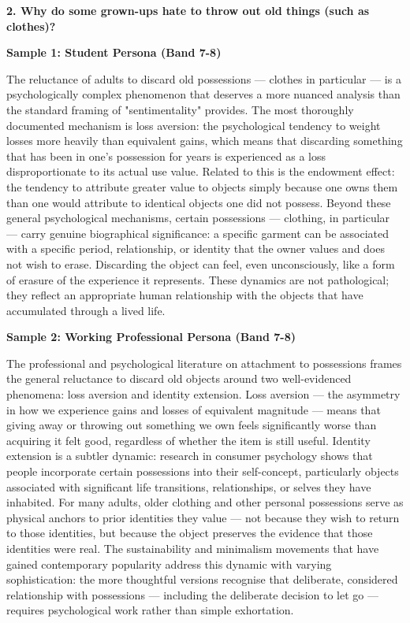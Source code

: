 \separator

\begin{ieltsquestion}
\textbf{2. Why do some grown-ups hate to throw out old things (such as clothes)?}
\end{ieltsquestion}
\textbf{Sample 1: Student Persona (Band 7-8)}

The reluctance of adults to discard old possessions — clothes in particular — is a psychologically complex phenomenon that deserves a more nuanced analysis than the standard framing of "sentimentality" provides. The most thoroughly documented mechanism is loss aversion: the psychological tendency to weight losses more heavily than equivalent gains, which means that discarding something that has been in one's possession for years is experienced as a loss disproportionate to its actual use value. Related to this is the endowment effect: the tendency to attribute greater value to objects simply because one owns them than one would attribute to identical objects one did not possess. Beyond these general psychological mechanisms, certain possessions — clothing, in particular — carry genuine biographical significance: a specific garment can be associated with a specific period, relationship, or identity that the owner values and does not wish to erase. Discarding the object can feel, even unconsciously, like a form of erasure of the experience it represents. These dynamics are not pathological; they reflect an appropriate human relationship with the objects that have accumulated through a lived life.

\textbf{Sample 2: Working Professional Persona (Band 7-8)}

The professional and psychological literature on attachment to possessions frames the general reluctance to discard old objects around two well-evidenced phenomena: loss aversion and identity extension. Loss aversion — the asymmetry in how we experience gains and losses of equivalent magnitude — means that giving away or throwing out something we own feels significantly worse than acquiring it felt good, regardless of whether the item is still useful. Identity extension is a subtler dynamic: research in consumer psychology shows that people incorporate certain possessions into their self-concept, particularly objects associated with significant life transitions, relationships, or selves they have inhabited. For many adults, older clothing and other personal possessions serve as physical anchors to prior identities they value — not because they wish to return to those identities, but because the object preserves the evidence that those identities were real. The sustainability and minimalism movements that have gained contemporary popularity address this dynamic with varying sophistication: the more thoughtful versions recognise that deliberate, considered relationship with possessions — including the deliberate decision to let go — requires psychological work rather than simple exhortation.

